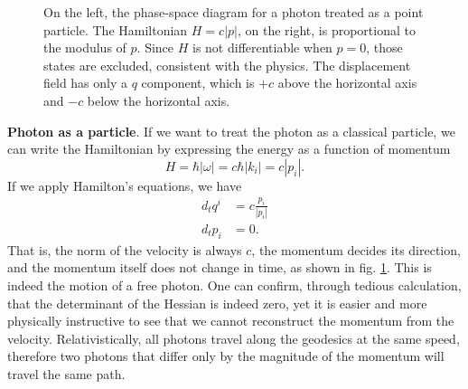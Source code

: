 \begin{figure}
	\centering
	\caption {On the left, the phase-space diagram for a photon treated as a point particle. The Hamiltonian $H=c|p|$, on the right, is proportional to the modulus of $p$. Since $H$ is not differentiable when $p=0$, those states are excluded, consistent with the physics. The displacement field has only a $q$ component, which is $+c$ above the horizontal axis and $-c$ below the horizontal axis. } \label{rp-cm-fig-photon}
\end{figure}

\textbf{Photon as a particle}. If we want to treat the photon as a classical particle, we can write the Hamiltonian by expressing the energy as a function of momentum
\begin{equation}
	H=\hbar | \omega| = c \hbar |k_i| = c |p_i|.
\end{equation}
If we apply Hamilton's equations, we have
\begin{equation}
	\begin{aligned}
		d_t q^i &= c \frac{p_i}{|p_i|} \\
		d_t p_i &= 0.
	\end{aligned}
\end{equation}
That is, the norm of the velocity is always $c$, the momentum decides its direction, and the momentum itself does not change in time, as shown in fig. \ref{rp-cm-fig-photon}. This is indeed the motion of a free photon. One can confirm, through tedious calculation, that the determinant of the Hessian is indeed zero, yet it is easier and more physically instructive to see that we cannot reconstruct the momentum from the velocity. Relativistically, all photons travel along the geodesics at the same speed, therefore two photons that differ only by the magnitude of the momentum will travel the same path.

